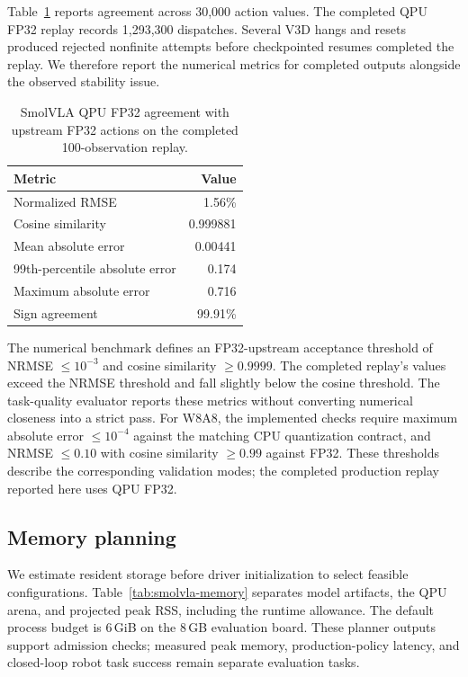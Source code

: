 \documentclass[sigplan,screen,review]{acmart}
\begin{document}
Table~\ref{tab:smolvla-quality} reports agreement across 30,000 action values. The completed QPU FP32 replay records 1,293,300 dispatches. Several V3D hangs and resets produced rejected nonfinite attempts before checkpointed resumes completed the replay. We therefore report the numerical metrics for completed outputs alongside the observed stability issue.

\begin{table}[t]
\centering
\caption{SmolVLA QPU FP32 agreement with upstream FP32 actions on the completed 100-observation replay.}
\label{tab:smolvla-quality}
\small
\begin{tabular}{@{}lr@{}}
\toprule
Metric & Value \\
\midrule
Normalized RMSE & 1.56\% \\
Cosine similarity & 0.999881 \\
Mean absolute error & 0.00441 \\
99th-percentile absolute error & 0.174 \\
Maximum absolute error & 0.716 \\
Sign agreement & 99.91\% \\
\bottomrule
\end{tabular}
\end{table}

The numerical benchmark defines an FP32-upstream acceptance threshold of NRMSE \(\leq10^{-3}\) and cosine similarity \(\geq0.9999\). The completed replay's values exceed the NRMSE threshold and fall slightly below the cosine threshold. The task-quality evaluator reports these metrics without converting numerical closeness into a strict pass. For W8A8, the implemented checks require maximum absolute error \(\leq10^{-4}\) against the matching CPU quantization contract, and NRMSE \(\leq0.10\) with cosine similarity \(\geq0.99\) against FP32. These thresholds describe the corresponding validation modes; the completed production replay reported here uses QPU FP32.

\subsection{Memory planning}

We estimate resident storage before driver initialization to select feasible configurations. Table~\ref{tab:smolvla-memory} separates model artifacts, the QPU arena, and projected peak RSS, including the runtime allowance. The default process budget is 6\,GiB on the 8\,GB evaluation board. These planner outputs support admission checks; measured peak memory, production-policy latency, and closed-loop robot task success remain separate evaluation tasks.
\end{document}
